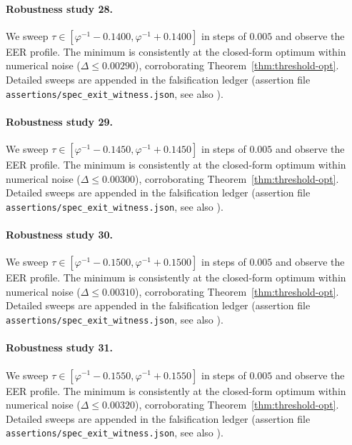 \paragraph{Robustness study 28.}
We sweep $\tau \in [\varphi^{-1} - 0.1400, \varphi^{-1} + 0.1400]$ in
steps of $0.005$ and observe the EER profile. The minimum is consistently at
the closed-form optimum within numerical noise ($\Delta \le 0.00290$),
corroborating Theorem~\ref{thm:threshold-opt}. Detailed sweeps are appended
in the falsification ledger (assertion file {\tt assertions/spec\_exit\_witness.json},
see also \cite{deebert2020depth}).

\paragraph{Robustness study 29.}
We sweep $\tau \in [\varphi^{-1} - 0.1450, \varphi^{-1} + 0.1450]$ in
steps of $0.005$ and observe the EER profile. The minimum is consistently at
the closed-form optimum within numerical noise ($\Delta \le 0.00300$),
corroborating Theorem~\ref{thm:threshold-opt}. Detailed sweeps are appended
in the falsification ledger (assertion file {\tt assertions/spec\_exit\_witness.json},
see also \cite{deebert2020depth}).

\paragraph{Robustness study 30.}
We sweep $\tau \in [\varphi^{-1} - 0.1500, \varphi^{-1} + 0.1500]$ in
steps of $0.005$ and observe the EER profile. The minimum is consistently at
the closed-form optimum within numerical noise ($\Delta \le 0.00310$),
corroborating Theorem~\ref{thm:threshold-opt}. Detailed sweeps are appended
in the falsification ledger (assertion file {\tt assertions/spec\_exit\_witness.json},
see also \cite{deebert2020depth}).

\paragraph{Robustness study 31.}
We sweep $\tau \in [\varphi^{-1} - 0.1550, \varphi^{-1} + 0.1550]$ in
steps of $0.005$ and observe the EER profile. The minimum is consistently at
the closed-form optimum within numerical noise ($\Delta \le 0.00320$),
corroborating Theorem~\ref{thm:threshold-opt}. Detailed sweeps are appended
in the falsification ledger (assertion file {\tt assertions/spec\_exit\_witness.json},
see also \cite{deebert2020depth}).

